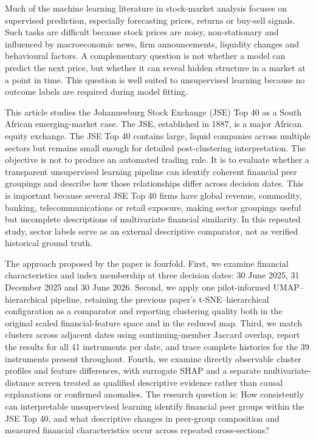 Much of the machine learning literature in stock-market analysis focuses on supervised prediction, especially forecasting prices, returns or buy-sell signals. Such tasks are difficult because stock prices are noisy, non-stationary and influenced by macroeconomic news, firm announcements, liquidity changes and behavioural factors. A complementary question is not whether a model can predict the next price, but whether it can reveal hidden structure in a market at a point in time. This question is well suited to unsupervised learning because no outcome labels are required during model fitting.


This article studies the Johannesburg Stock Exchange (JSE) Top 40 as a South African emerging-market case. The JSE, established in 1887, is a major African equity exchange. The JSE Top 40 contains large, liquid companies across multiple sectors but remains small enough for detailed post-clustering interpretation. The objective is not to produce an automated trading rule. It is to evaluate whether a transparent unsupervised learning pipeline can identify coherent financial peer groupings and describe how those relationships differ across decision dates. This is important because several JSE Top 40 firms have global revenue, commodity, banking, telecommunications or retail exposure, making sector groupings useful but incomplete descriptions of multivariate financial similarity. In this repeated study, sector labels serve as an external descriptive comparator, not as verified historical ground truth.


The approach proposed by the paper is fourfold. First, we examine financial characteristics and index membership at three decision dates: 30 June 2025, 31 December 2025 and 30 June 2026. Second, we apply one pilot-informed UMAP--hierarchical pipeline, retaining the previous paper's t-SNE--hierarchical configuration as a comparator and reporting clustering quality both in the original scaled financial-feature space and in the reduced map. Third, we match clusters across adjacent dates using continuing-member Jaccard overlap, report the results for all 41 instruments per date, and trace complete histories for the 39 instruments present throughout. Fourth, we examine directly observable cluster profiles and feature differences, with surrogate SHAP and a separate multivariate-distance screen treated as qualified descriptive evidence rather than causal explanations or confirmed anomalies. The research question is: How consistently can interpretable unsupervised learning identify financial peer groups within the JSE Top 40, and what descriptive changes in peer-group composition and measured financial characteristics occur across repeated cross-sections?



